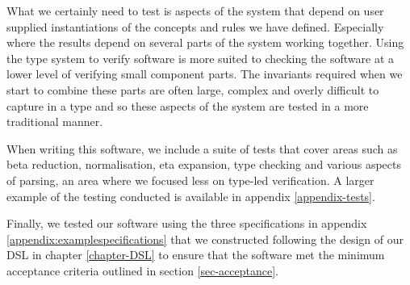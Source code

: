What we certainly need to test is aspects of the system that depend on
user supplied instantiations of the concepts and rules we have
defined. Especially where the results depend on several parts of the
system working together. Using the type system to verify software is
more suited to checking the software at a lower level of verifying
small component parts. The invariants required when we start to
combine these parts are often large, complex and overly difficult to
capture in a type and so these aspects of the system are tested in a
more traditional manner.

When writing this software, we include a suite of tests that cover
areas such as beta reduction, normalisation, eta expansion, type
checking and various aspects of parsing, an area where we
focused less on type-led verification. A larger example of the testing
conducted is available in appendix \ref{appendix-tests}.

Finally, we tested our software using the three specifications in
appendix \ref{appendix:examplespecifications} that we constructed
following the design of our DSL in chapter \ref{chapter-DSL} to ensure
that the software met the minimum acceptance criteria outlined in
section \ref{sec-acceptance}.
